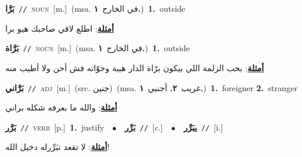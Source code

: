 \documentclass[10pt,a4paper,twoside]{article} %
\begin{document}
\begin{multicols}{2}
{\setlength\topsep{0pt}\textbf{\foreignlanguage{arabic}{بَرَّا}}\ {\color{gray}\texttt{//}\color{black}}\ \textsc{noun}\ [m.]\ \color{gray}(msa. \foreignlanguage{arabic}{في الخارج}~\foreignlanguage{arabic}{\textbf{١.}})\color{black}\ \textbf{1.}~outside\  \begin{flushright}\color{gray}\foreignlanguage{arabic}{\textbf{\underline{\foreignlanguage{arabic}{أمثلة}}}: اطلع لاقي صاحبك هيو برا}\end{flushright}\color{black}} \vspace{2mm}

{\setlength\topsep{0pt}\textbf{\foreignlanguage{arabic}{بَرَّاة}}\ {\color{gray}\texttt{//}\color{black}}\ \textsc{noun}\ [m.]\ \color{gray}(msa. \foreignlanguage{arabic}{في الخارج}~\foreignlanguage{arabic}{\textbf{١.}})\color{black}\ \textbf{1.}~outside\  \begin{flushright}\color{gray}\foreignlanguage{arabic}{\textbf{\underline{\foreignlanguage{arabic}{أمثلة}}}: بحب الزلمة اللي بيكون برّاة الدار هيبة وجوّاته فش أحن ولا أطيب منه}\end{flushright}\color{black}} \vspace{2mm}

{\setlength\topsep{0pt}\textbf{\foreignlanguage{arabic}{بَرَّاني}}\ {\color{gray}\texttt{//}\color{black}}\ \textsc{adj}\ [m.]\ (src. \color{gray}\foreignlanguage{arabic}{جنين}\color{black})\ \color{gray}(msa. \foreignlanguage{arabic}{غريب}~\foreignlanguage{arabic}{\textbf{٢.}}  \foreignlanguage{arabic}{أجنبي}~\foreignlanguage{arabic}{\textbf{١.}})\color{black}\ \textbf{1.}~foreigner  \textbf{2.}~stranger\  \begin{flushright}\color{gray}\foreignlanguage{arabic}{\textbf{\underline{\foreignlanguage{arabic}{أمثلة}}}: والله ما بعرفه شكله براني}\end{flushright}\color{black}} \vspace{2mm}

{\setlength\topsep{0pt}\textbf{\foreignlanguage{arabic}{بَرَّر}}\ {\color{gray}\texttt{//}\color{black}}\ \textsc{verb}\ [p.]\ \textbf{1.}~justify\ \ $\bullet$\ \ \setlength\topsep{0pt}\textbf{\foreignlanguage{arabic}{بَرِّر}}\ {\color{gray}\texttt{//}\color{black}}\ [c.]\ \ $\bullet$\ \ \setlength\topsep{0pt}\textbf{\foreignlanguage{arabic}{يبَرِّر}}\ {\color{gray}\texttt{//}\color{black}}\ [i.]\  \begin{flushright}\color{gray}\foreignlanguage{arabic}{\textbf{\underline{\foreignlanguage{arabic}{أمثلة}}}: لا تقعد تبَرِّرله دخيل الله!}\end{flushright}\color{black}} \vspace{2mm}


\end{multicols}
\end{document}
